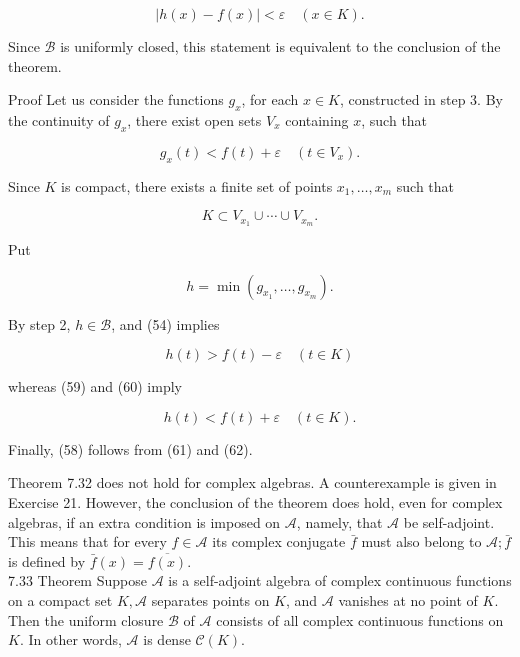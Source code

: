 \documentclass[10pt]{article}
\begin{document}
\begin{equation*}
|h(x)-f(x)|<\varepsilon \quad(x \in K) . \tag{58}
\end{equation*}


Since $\mathscr{B}$ is uniformly closed, this statement is equivalent to the conclusion of the theorem.

Proof Let us consider the functions $g_{x}$, for each $x \in K$, constructed in step 3. By the continuity of $g_{x}$, there exist open sets $V_{x}$ containing $x$, such that


\begin{equation*}
g_{x}(t)<f(t)+\varepsilon \quad\left(t \in V_{x}\right) . \tag{59}
\end{equation*}


Since $K$ is compact, there exists a finite set of points $x_{1}, \ldots, x_{m}$ such that


\begin{equation*}
K \subset V_{x_{1}} \cup \cdots \cup V_{x_{m}} . \tag{60}
\end{equation*}


Put

$$
h=\min \left(g_{x_{1}}, \ldots, g_{x_{m}}\right) .
$$

By step 2, $h \in \mathscr{B}$, and (54) implies


\begin{equation*}
h(t)>f(t)-\varepsilon \quad(t \in K) \tag{61}
\end{equation*}


whereas (59) and (60) imply


\begin{equation*}
h(t)<f(t)+\varepsilon \quad(t \in K) . \tag{62}
\end{equation*}


Finally, (58) follows from (61) and (62).

Theorem 7.32 does not hold for complex algebras. A counterexample is given in Exercise 21. However, the conclusion of the theorem does hold, even for complex algebras, if an extra condition is imposed on $\mathscr{A}$, namely, that $\mathscr{A}$ be self-adjoint. This means that for every $f \in \mathscr{A}$ its complex conjugate $\bar{f}$ must also belong to $\mathscr{A} ; \bar{f}$ is defined by $\bar{f}(x)=\overline{f(x)}$.\\
7.33 Theorem Suppose $\mathscr{A}$ is a self-adjoint algebra of complex continuous functions on a compact set $K, \mathscr{A}$ separates points on $K$, and $\mathscr{A}$ vanishes at no point of $K$. Then the uniform closure $\mathscr{B}$ of $\mathscr{A}$ consists of all complex continuous functions on $K$. In other words, $\mathscr{A}$ is dense $\mathscr{C}(K)$.
\end{document}
